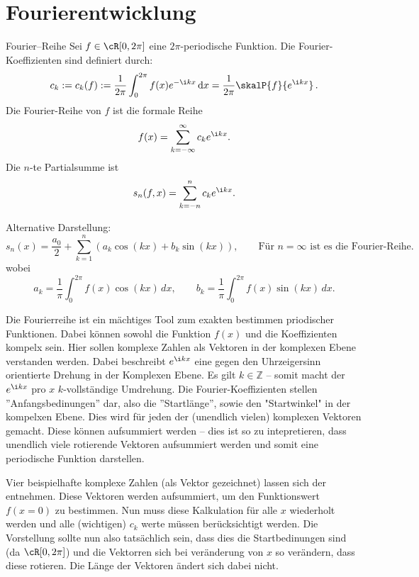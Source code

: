 \newpage
\section{Fourierentwicklung}
\label{sec:1.2}

\begin{definition}{Fourier--Reihe}
    Sei $f\in \cR[0,2\pi]$ eine $2\pi$-periodische Funktion. Die Fourier-Koeffizienten
    sind definiert durch:
    $$
        c_{k} := c_{k}(f) := \frac{1}{2\pi} \int_{0}^{2\pi} f(x)e^{-\i kx} \, \mathrm{d}x = \frac{1}{2\pi} \skalP{f}{e^{\i kx}} \, .
    $$
    Die Fourier-Reihe von $f$ ist die formale Reihe
    $$
        f(x) = \sum_{k=-\infty}^{\infty} c_k e^{\i kx}.
    $$
    Die $n$-te Partialsumme ist
    $$
        s_n(f,x) = \sum_{k=-n}^{n} c_k e^{\i kx}.
    $$

    Alternative Darstellung:
    $$
        s_n(x) = \frac{a_0}{2} + \sum_{k=1}^{n} \left(a_k \cos(kx) + b_k \sin(kx)\right), \qquad \text{Für } n = \infty \text{ ist es die Fourier-Reihe.}
    $$
    wobei
    $$
        a_k = \frac{1}{\pi}\int_0^{2\pi} f(x)\cos(kx)\,dx,\qquad
        b_k = \frac{1}{\pi}\int_0^{2\pi} f(x)\sin(kx)\,dx.
    $$
\end{definition}
Die Fourierreihe ist ein mächtiges Tool zum exakten bestimmen priodischer Funktionen. Dabei können sowohl die Funktion $f(x)$ und die Koeffizienten kompelx sein. Hier sollen komplexe Zahlen als Vektoren in der komplexen Ebene verstanden werden.
Dabei beschreibt $e^{\i kx}$ eine gegen den Uhrzeigersinn orientierte Drehung in der Komplexen Ebene. Es gilt $k \in \mathbb{Z}$ -- somit macht der $e^{\i kx}$ pro $x$ $k$-vollständige Umdrehung. Die Fourier-Koeffizienten stellen ''Anfangsbedinungen'' dar, also die ''Startlänge'', sowie den "Startwinkel" in der kompelxen Ebene.
Dies wird für jeden der (unendlich vielen) komplexen Vektoren gemacht. Diese können aufsummiert werden -- dies ist so zu intepretieren, dass unendlich viele rotierende Vektoren aufsummiert werden und somit eine periodische Funktion darstellen. 

Vier beispielhafte komplexe Zahlen (als Vektor gezeichnet) lassen sich der  entnehmen. Diese Vektoren werden aufsummiert, um den Funktionswert $f(x=0)$ zu bestimmen. Nun muss diese Kalkulation für alle $x$ wiederholt werden und alle (wichtigen) $c_k$ werte müssen berücksichtigt werden.
Die Vorstellung sollte nun also tatsächlich sein, dass dies die Startbedinungen sind (da $\cR[0,2\pi]$) und die Vektorren sich bei veränderung von $x$ so verändern, dass diese rotieren. Die Länge der Vektoren ändert sich dabei nicht.

